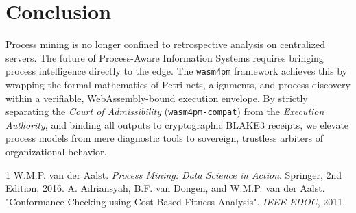 \documentclass[11pt,a4paper]{article}
\begin{document}
\section{Conclusion}

Process mining is no longer confined to retrospective analysis on centralized servers. The future of Process-Aware Information Systems requires bringing process intelligence directly to the edge. The \texttt{wasm4pm} framework achieves this by wrapping the formal mathematics of Petri nets, alignments, and process discovery within a verifiable, WebAssembly-bound execution envelope. By strictly separating the \textit{Court of Admissibility} (\texttt{wasm4pm-compat}) from the \textit{Execution Authority}, and binding all outputs to cryptographic BLAKE3 receipts, we elevate process models from mere diagnostic tools to sovereign, trustless arbiters of organizational behavior.


\begin{thebibliography}{1}
W.M.P. van der Aalst. \textit{Process Mining: Data Science in Action}. Springer, 2nd Edition, 2016.
A. Adriansyah, B.F. van Dongen, and W.M.P. van der Aalst. "Conformance Checking using Cost-Based Fitness Analysis". \textit{IEEE EDOC}, 2011.
\end{thebibliography}
\end{document}
